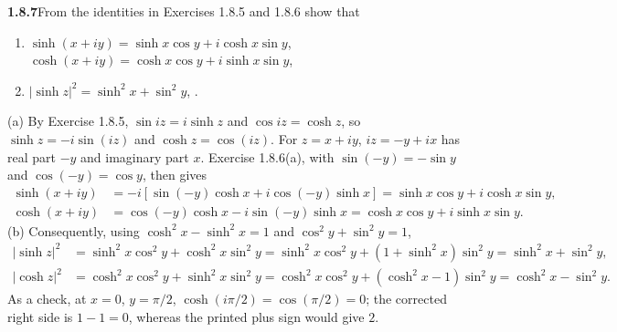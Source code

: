 \par\bigskip
\noindent\textbf{1.8.7}\quad From the identities in Exercises 1.8.5 and 1.8.6
show that
\begin{enumerate}
\item[(a)] $\sinh(x+iy)=\sinh x\cos y+i\cosh x\sin y$,\\
  $\cosh(x+iy)=\cosh x\cos y+i\sinh x\sin y$,
\item[(b)] $|\sinh z|^{2}=\sinh^{2}x+\sin^{2}y$,\quad
  .
\end{enumerate}
\solution
(a) By Exercise 1.8.5, $\sin iz=i\sinh z$ and $\cos iz=\cosh z$, so
$\sinh z=-i\sin(iz)$ and $\cosh z=\cos(iz)$. For $z=x+iy$,
$iz=-y+ix$ has real part $-y$ and imaginary part $x$. Exercise
1.8.6(a), with $\sin(-y)=-\sin y$ and $\cos(-y)=\cos y$, then gives
\[
 \begin{aligned}
 \sinh(x+iy)&=-i[\sin(-y)\cosh x+i\cos(-y)\sinh x]
            =\sinh x\cos y+i\cosh x\sin y,\\
 \cosh(x+iy)&=\cos(-y)\cosh x-i\sin(-y)\sinh x
            =\cosh x\cos y+i\sinh x\sin y.
 \end{aligned}
\]
(b) Consequently, using $\cosh^2x-\sinh^2x=1$ and
$\cos^2y+\sin^2y=1$,
\[
 \begin{aligned}
 |\sinh z|^2&=\sinh^2x\cos^2y+\cosh^2x\sin^2y
             =\sinh^2x\cos^2y+(1+\sinh^2x)\sin^2y
             =\sinh^2x+\sin^2y,\\
 |\cosh z|^2&=\cosh^2x\cos^2y+\sinh^2x\sin^2y
             =\cosh^2x\cos^2y+(\cosh^2x-1)\sin^2y
             =\cosh^2x-\sin^2y.
 \end{aligned}
\]
 As a check, at $x=0$,
$y=\pi/2$, $\cosh(i\pi/2)=\cos(\pi/2)=0$; the corrected right side is
$1-1=0$, whereas the printed plus sign would give $2$.


